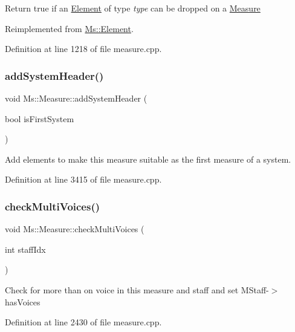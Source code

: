 Return true if an \hyperlink{class_ms_1_1_element}{Element} of type {\itshape type} can be dropped on a \hyperlink{class_ms_1_1_measure}{Measure} 

Reimplemented from \hyperlink{class_ms_1_1_element_a35614445f0bc2212cbcc75c3f5810543}{Ms\+::\+Element}.



Definition at line 1218 of file measure.\+cpp.

\mbox{\label{class_ms_1_1_measure_ac7e0eb9cc9bfb9d619f2cb52ba6f2ea8}} 
\subsubsection{\texorpdfstring{add\+System\+Header()}{addSystemHeader()}}
{\footnotesize\ttfamily void Ms\+::\+Measure\+::add\+System\+Header (\begin{DoxyParamCaption}\item[{bool}]{is\+First\+System }\end{DoxyParamCaption})}

Add elements to make this measure suitable as the first measure of a system. 

Definition at line 3415 of file measure.\+cpp.

\mbox{\label{class_ms_1_1_measure_aef2c1170f14dd5ba1a773c2d7e28d067}} 
\subsubsection{\texorpdfstring{check\+Multi\+Voices()}{checkMultiVoices()}}
{\footnotesize\ttfamily void Ms\+::\+Measure\+::check\+Multi\+Voices (\begin{DoxyParamCaption}\item[{int}]{staff\+Idx }\end{DoxyParamCaption})}

Check for more than on voice in this measure and staff and set M\+Staff-\/$>$has\+Voices 

Definition at line 2430 of file measure.\+cpp.

\mbox{\label{class_ms_1_1_measure_ab1083a3a6e0ac7cd35a27d9d71829560}} 
